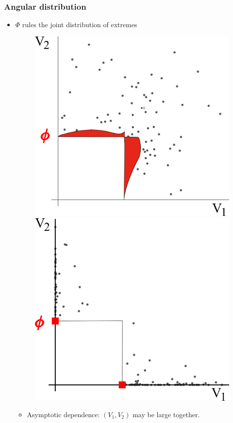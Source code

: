\documentclass[10pt]{beamer}
\begin{document}
\begin{frame}
  \frametitle{Angular distribution}
  \begin{itemize}
\item 
$\Phi$ rules  the joint distribution of extremes
     \begin{figure}[h]
      \centering
      \includegraphics[scale=0.3]{sourcefigs/Example2D_depSquare.png}
      \includegraphics[scale=0.3]{sourcefigs/Example2D_indepSquare.png}
    \end{figure}
    \begin{itemize}
    \item Asymptotic dependence: $(V_1,V_2)$ may be large together.


\end{itemize}
\end{itemize}
\end{frame}
\end{document}
